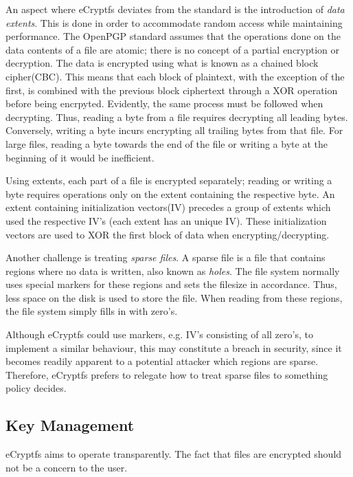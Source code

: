 An aspect where eCryptfs deviates from the standard is the introduction of \textit{data extents}. This is done in order to accommodate random access while maintaining performance. The OpenPGP standard assumes that the operations done on the data contents of a file are atomic; there is no concept of a partial encryption or decryption. The data is encrypted using what is known as a chained block cipher(CBC). This means that each block of plaintext, with the exception of the first, is combined with the previous block ciphertext through a XOR operation before being encrpyted. Evidently, the same process must be followed when decrypting. Thus, reading a byte from a file requires decrypting all leading bytes. Conversely, writing a byte incurs encrypting all trailing bytes from that file. For large files, reading a byte towards the end of the file or writing a byte at the beginning of it would be inefficient.

Using extents, each part of a file is encrypted separately; reading or writing a byte requires operations only on the extent containing the respective byte. An extent containing initialization vectors(IV) precedes a group of extents which used the respective IV's (each extent has an unique IV). These initialization vectors are used to XOR the first block of data when encrypting/decrypting.

Another challenge is treating \textit{sparse files}. A sparse file is a file that contains regions where no data is written, also known as \textit{holes}. The file system normally uses special markers for these regions and sets the filesize in accordance. Thus, less space on the disk is used to store the file. When reading from these regions, the file system simply fills in with zero's.

Although eCryptfs could use markers, e.g. IV's consisting of all zero's, to implement a similar behaviour, this may constitute a breach in security, since it becomes readily apparent to a potential attacker which regions are sparse.
Therefore, eCryptfs prefers to relegate how to treat sparse files to something policy decides.

\subsection{Key Management}
\label{sub-sec:keys-ecryptfs}

eCryptfs aims to operate transparently. The fact that files are encrypted should not be a concern to the user.

